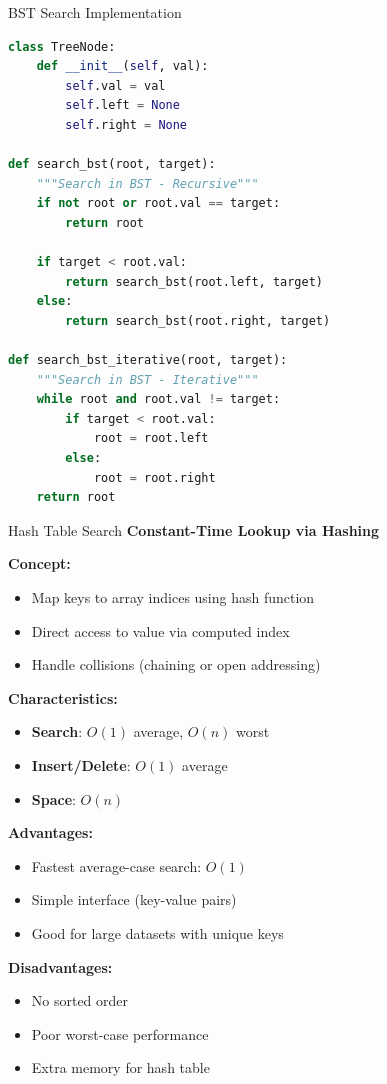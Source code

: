 \documentclass[aspectratio=169]{beamer}
\begin{document}
\begin{frame}[fragile]{BST Search Implementation}
\begin{lstlisting}[language=Python, basicstyle=\ttfamily\small]
class TreeNode:
    def __init__(self, val):
        self.val = val
        self.left = None
        self.right = None

def search_bst(root, target):
    """Search in BST - Recursive"""
    if not root or root.val == target:
        return root

    if target < root.val:
        return search_bst(root.left, target)
    else:
        return search_bst(root.right, target)

def search_bst_iterative(root, target):
    """Search in BST - Iterative"""
    while root and root.val != target:
        if target < root.val:
            root = root.left
        else:
            root = root.right
    return root
\end{lstlisting}
\end{frame}

\begin{frame}{Hash Table Search}
  \textbf{Constant-Time Lookup via Hashing}

  \vspace{0.3cm}
  \textbf{Concept:}
  \begin{itemize}
    \item Map keys to array indices using hash function
    \item Direct access to value via computed index
    \item Handle collisions (chaining or open addressing)
  \end{itemize}

  \vspace{0.3cm}
  \textbf{Characteristics:}
  \begin{itemize}
    \item \textbf{Search}: $O(1)$ average, $O(n)$ worst
    \item \textbf{Insert/Delete}: $O(1)$ average
    \item \textbf{Space}: $O(n)$
  \end{itemize}

  \vspace{0.3cm}
  \textbf{Advantages:}
  \begin{itemize}
    \item Fastest average-case search: $O(1)$
    \item Simple interface (key-value pairs)
    \item Good for large datasets with unique keys
  \end{itemize}

  \vspace{0.3cm}
  \textbf{Disadvantages:}
  \begin{itemize}
    \item No sorted order
    \item Poor worst-case performance
    \item Extra memory for hash table
  \end{itemize}
\end{frame}
\end{document}

